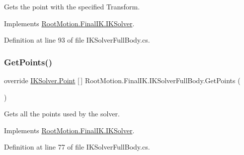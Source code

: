 Gets the point with the specified Transform. 



Implements \mbox{\hyperlink{class_root_motion_1_1_final_i_k_1_1_i_k_solver_a8e845886025fb0ca404b85f6747f7281}{Root\+Motion.\+Final\+I\+K.\+I\+K\+Solver}}.



Definition at line 93 of file I\+K\+Solver\+Full\+Body.\+cs.

\mbox{\label{class_root_motion_1_1_final_i_k_1_1_i_k_solver_full_body_a3f5d0189403f02d2b30c6174c2a00fbb}} 
\subsubsection{\texorpdfstring{Get\+Points()}{GetPoints()}}
{\footnotesize\ttfamily override \mbox{\hyperlink{class_root_motion_1_1_final_i_k_1_1_i_k_solver_1_1_point}{I\+K\+Solver.\+Point}} \mbox{[}$\,$\mbox{]} Root\+Motion.\+Final\+I\+K.\+I\+K\+Solver\+Full\+Body.\+Get\+Points (\begin{DoxyParamCaption}{ }\end{DoxyParamCaption})\hspace{0.3cm}{\ttfamily [virtual]}}



Gets all the points used by the solver. 



Implements \mbox{\hyperlink{class_root_motion_1_1_final_i_k_1_1_i_k_solver_a29b0746bebf6bd6645cdeb6617030bff}{Root\+Motion.\+Final\+I\+K.\+I\+K\+Solver}}.



Definition at line 77 of file I\+K\+Solver\+Full\+Body.\+cs.

\mbox{\label{class_root_motion_1_1_final_i_k_1_1_i_k_solver_full_body_a52e5312dcea8441bec26f0a9c2bf54f2}} 
